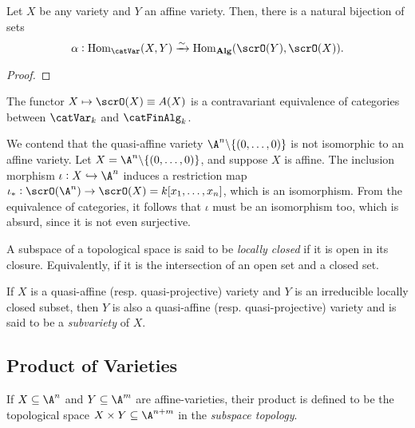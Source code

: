 \begin{theorem}
    Let $X$ be any variety and $Y$ an affine variety. Then, there is a natural bijection of sets
    \begin{equation*}
        \alpha: \Hom_{\catVar}(X, Y)\xrightarrow{\sim}\Hom_{\catAlg}(\scrO(Y),\scrO(X)).
    \end{equation*}
\end{theorem}
\begin{proof}
\end{proof}

\begin{corollary}
    The functor $X\mapsto\scrO(X)\equiv A(X)$ is a contravariant equivalence of categories between $\catVar_k$ and $\catFinAlg_k$.
\end{corollary}

\begin{example}
    We contend that the quasi-affine variety $\A^n\backslash\{(0,\dots,0)\}$ is not isomorphic to an affine variety. Let $X = \A^n\backslash\{(0,\dots,0)\}$, and suppose $X$ is affine. The inclusion morphism $\iota: X\into\A^n$ induces a restriction map $\iota_\ast:\scrO(\A^n)\to\scrO(X) = k[x_1,\dots,x_n]$, which is an isomorphism. From the equivalence of categories, it follows that $\iota$ must be an isomorphism too, which is absurd, since it is not even surjective.
\end{example}

\begin{definition}
    A subspace of a topological space is said to be \emph{locally closed} if it is open in its closure. Equivalently, if it is the intersection of an open set and a closed set.
\end{definition}

\begin{definition}
    If $X$ is a quasi-affine (resp. quasi-projective) variety and $Y$ is an irreducible locally closed subset, then $Y$ is also a quasi-affine (resp. quasi-projective) variety and is said to be a \emph{subvariety} of $X$.
\end{definition}

\subsection{Product of Varieties}

\begin{definition}
    If $X\subseteq\A^n$ and $Y\subseteq\A^m$ are affine-varieties, their product is defined to be the topological space $X\times Y\subseteq\A^{n + m}$ in the \emph{subspace topology}.
\end{definition}

